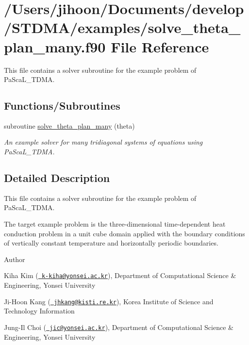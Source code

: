 \hypertarget{solve__theta__plan__many_8f90}{}\section{/\+Users/jihoon/\+Documents/develop/\+S\+T\+D\+M\+A/examples/solve\+\_\+theta\+\_\+plan\+\_\+many.f90 File Reference}
\label{solve__theta__plan__many_8f90}


This file contains a solver subroutine for the example problem of Pa\+Sca\+L\+\_\+\+T\+D\+MA.  


\subsection*{Functions/\+Subroutines}
\begin{DoxyCompactItemize}
\item 
subroutine \mbox{\hyperlink{solve__theta__plan__many_8f90_af048018fcdfbe66e00922dee3e7e9a64}{solve\+\_\+theta\+\_\+plan\+\_\+many}} (theta)
\begin{DoxyCompactList}\small\item\em An example solver for many tridiagonal systems of equations using Pa\+Sca\+L\+\_\+\+T\+D\+MA. \end{DoxyCompactList}\end{DoxyCompactItemize}


\subsection{Detailed Description}
This file contains a solver subroutine for the example problem of Pa\+Sca\+L\+\_\+\+T\+D\+MA. 

The target example problem is the three-\/dimensional time-\/dependent heat conduction problem in a unit cube domain applied with the boundary conditions of vertically constant temperature and horizontally periodic boundaries. \begin{DoxyAuthor}{Author}

\end{DoxyAuthor}

\begin{DoxyItemize}
\item Kiha Kim (\href{mailto:k-kiha@yonsei.ac.kr}{\texttt{ k-\/kiha@yonsei.\+ac.\+kr}}), Department of Computational Science \& Engineering, Yonsei University
\item Ji-\/\+Hoon Kang (\href{mailto:jhkang@kisti.re.kr}{\texttt{ jhkang@kisti.\+re.\+kr}}), Korea Institute of Science and Technology Information
\item Jung-\/\+Il Choi (\href{mailto:jic@yonsei.ac.kr}{\texttt{ jic@yonsei.\+ac.\+kr}}), Department of Computational Science \& Engineering, Yonsei University
\end{DoxyItemize}

